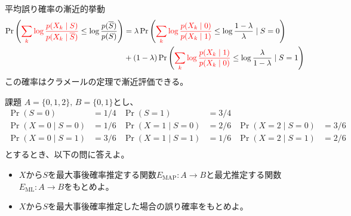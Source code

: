\documentclass[lualatex,handout]{beamer}
\newcommand{\mycolor}[2]{%
  \begingroup
  \colorlet{currentcolor}{.}%
  \color{#1}#2%
  \color{currentcolor}%
  \endgroup
}
\newcommand{\emm}[1]{\mycolor{red}{#1}}
\theoremstyle{definition}
\begin{document}
\begin{frame}{平均誤り確率の漸近的挙動}
\footnotesize
\begin{align*}
\Pr\left(\emm{\sum_k \log\frac{p(X_k\mid S)}{p(X_k\mid \overline{S})}} \le \log\frac{p(\overline{S})}{p(S)}\right)
&=
\lambda \Pr\left(\emm{\sum_k \log\frac{p(X_k\mid 0)}{p(X_k\mid 1)}} \le \log\frac{1-\lambda}{\lambda}\mid S=0\right)\\
&+
(1-\lambda) \Pr\left(\emm{\sum_k \log\frac{p(X_k\mid 1)}{p(X_k\mid 0)}} \le \log\frac{\lambda}{1-\lambda}\mid S=1\right)
\end{align*}
この確率はクラメールの定理で漸近評価できる。


\end{frame}

\begin{frame}{課題}
\small
$A=\{0,1,2\},\,B=\{0, 1\}$とし、
\begin{align*}
\Pr(S = 0) &= 1/4&
\Pr(S = 1) &= 3/4\\
\Pr(X=0\mid S=0) &= 1/6&
\Pr(X=1\mid S=0) &= 2/6&
\Pr(X=2\mid S=0) &= 3/6\\
\Pr(X=0\mid S=1) &= 3/6&
\Pr(X=1\mid S=1) &= 1/6&
\Pr(X=2\mid S=1) &= 2/6\\
\end{align*}
とするとき、以下の問に答えよ。
\vspace{1em}
\begin{itemize}
\setlength{\itemsep}{1em}
\item $X$から$S$を最大事後確率推定する関数$E_{\mathrm{MAP}}\colon A\to B$と最尤推定する関数$E_{\mathrm{ML}}\colon A\to B$をもとめよ。
\item $X$から$S$を最大事後確率推定した場合の誤り確率をもとめよ。
\end{itemize}
\end{frame}
\end{document}
